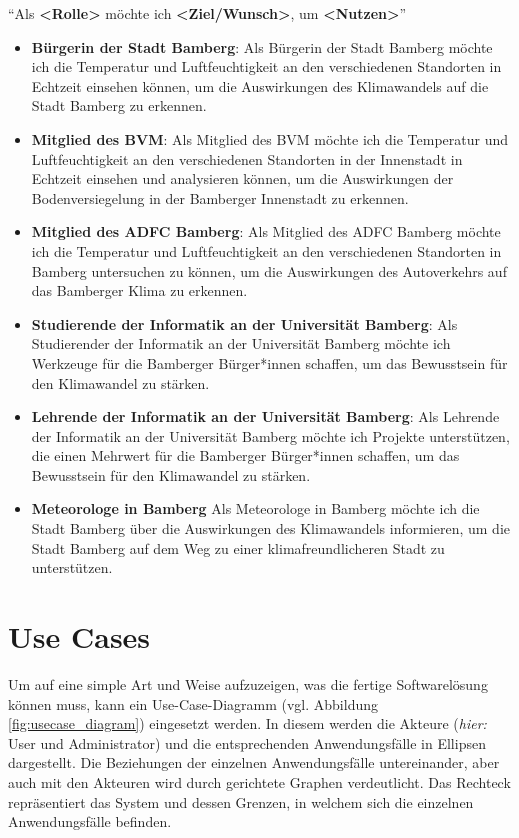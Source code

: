 \enquote{Als \textbf{<Rolle>} möchte ich \textbf{<Ziel/Wunsch>}, um \textbf{<Nutzen>}}

\begin{itemize}
    \item \textbf{Bürgerin der Stadt Bamberg}: Als Bürgerin der Stadt Bamberg möchte ich die Temperatur und Luftfeuchtigkeit an den verschiedenen Standorten in Echtzeit einsehen können, um die Auswirkungen des Klimawandels auf die Stadt Bamberg zu erkennen.
    \item \textbf{Mitglied des \ac{BVM}}: Als Mitglied des \ac{BVM} möchte ich die Temperatur und Luftfeuchtigkeit an den verschiedenen Standorten in der Innenstadt in Echtzeit einsehen und analysieren können, um die Auswirkungen der Bodenversiegelung in der Bamberger Innenstadt zu erkennen.
    \item \textbf{Mitglied des \ac{ADFC} Bamberg}: Als Mitglied des \ac{ADFC} Bamberg möchte ich die Temperatur und Luftfeuchtigkeit an den verschiedenen Standorten in Bamberg untersuchen zu können, um die Auswirkungen des Autoverkehrs auf das Bamberger Klima zu erkennen.
    \item \textbf{Studierende der Informatik an der Universität Bamberg}: Als Studierender der Informatik an der Universität Bamberg möchte ich Werkzeuge für die Bamberger Bürger*innen schaffen, um das Bewusstsein für den Klimawandel zu stärken.
    \item \textbf{Lehrende der Informatik an der Universität Bamberg}: Als Lehrende der Informatik an der Universität Bamberg möchte ich Projekte unterstützen, die einen Mehrwert für die Bamberger Bürger*innen schaffen, um das Bewusstsein für den Klimawandel zu stärken.
    \item \textbf{Meteorologe in Bamberg} Als Meteorologe in Bamberg möchte ich die Stadt Bamberg über die Auswirkungen des Klimawandels informieren, um die Stadt Bamberg auf dem Weg zu einer klimafreundlicheren Stadt zu unterstützen.
\end{itemize}

\section{Use Cases}
Um auf eine simple Art und Weise aufzuzeigen, was die fertige Softwarelösung können muss, kann ein Use-Case-Diagramm (vgl. Abbildung \ref{fig:usecase_diagram}) eingesetzt werden. In diesem werden die Akteure (\textit{hier:} User und Administrator) und die entsprechenden Anwendungsfälle in Ellipsen dargestellt. Die Beziehungen der einzelnen Anwendungsfälle untereinander, aber auch mit den Akteuren wird durch gerichtete Graphen verdeutlicht. Das Rechteck repräsentiert das System und dessen Grenzen, in welchem sich die einzelnen Anwendungsfälle befinden. 


